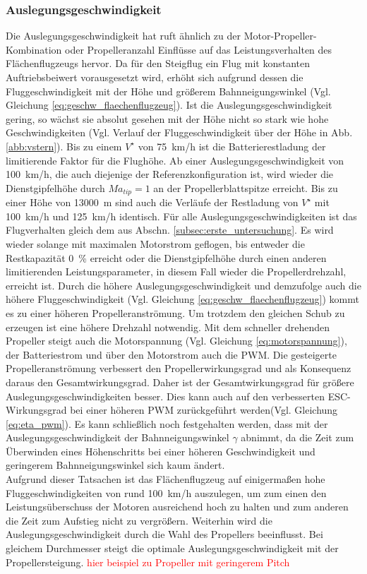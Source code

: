 \subsubsection{Auslegungsgeschwindigkeit}
\label{subsubsec:vstern}
Die Auslegungsgeschwindigkeit hat ruft ähnlich zu der Motor-Propeller-Kombination oder Propelleranzahl Einflüsse auf das Leistungsverhalten des Flächenflugzeugs hervor. Da für den Steigflug ein Flug mit konstanten Auftriebsbeiwert vorausgesetzt wird, erhöht sich aufgrund dessen die Fluggeschwindigkeit mit der Höhe und größerem Bahnneigungswinkel (Vgl. Gleichung \ref{eq:geschw_flaechenflugzeug}).
Ist die Auslegungsgeschwindigkeit gering, so wächst sie absolut gesehen mit der Höhe nicht so stark wie hohe Geschwindigkeiten (Vgl. Verlauf der Fluggeschwindigkeit über der Höhe in Abb. \ref{abb:vstern}). 
Bis zu einem \ensuremath{V^\star} von \SI{75}{km/h} ist die Batterierestladung der limitierende Faktor für die Flughöhe. Ab einer Auslegungsgeschwindigkeit von \SI{100}{km/h}, die auch diejenige der Referenzkonfiguration ist, wird wieder die Dienstgipfelhöhe durch \ensuremath{Ma_{tip} = 1} an der Propellerblattspitze erreicht. Bis zu einer Höhe von \SI{13000}{m} sind auch die Verläufe der Restladung von \ensuremath{V^\star} mit \SI{100}{km/h} und \SI{125}{km/h} identisch. Für alle Auslegungsgeschwindigkeiten ist das Flugverhalten gleich dem aus Abschn. \ref{subsec:erste_untersuchung}. Es wird wieder solange mit maximalen Motorstrom geflogen, bis entweder die Restkapazität \SI{0}{\%} erreicht oder die Dienstgipfelhöhe durch einen anderen limitierenden Leistungsparameter, in diesem Fall wieder die Propellerdrehzahl, erreicht ist. Durch die höhere Auslegungsgeschwindigkeit und demzufolge auch die höhere Fluggeschwindigkeit (Vgl. Gleichung \ref{eq:geschw_flaechenflugzeug}) kommt es zu einer höheren Propelleranströmung. Um trotzdem den gleichen Schub zu erzeugen ist eine höhere Drehzahl notwendig. Mit dem schneller drehenden Propeller steigt auch die Motorspannung (Vgl. Gleichung \ref{eq:motorspannung}), der Batteriestrom und über den Motorstrom auch die PWM. Die gesteigerte Propelleranströmung verbessert den Propellerwirkungsgrad und als Konsequenz daraus den Gesamtwirkungsgrad. Daher ist der Gesamtwirkungsgrad für größere Auslegungsgeschwindigkeiten besser. Dies kann auch auf den verbesserten ESC-Wirkungsgrad bei einer höheren PWM zurückgeführt werden(Vgl. Gleichung \ref{eq:eta_pwm}). Es kann schließlich noch festgehalten werden, dass mit der Auslegungsgeschwindigkeit der Bahnneigungswinkel \ensuremath{\gamma} abnimmt, da die Zeit zum Überwinden eines Höhenschritts bei einer höheren Geschwindigkeit und geringerem Bahnneigungswinkel sich kaum ändert. \\
Aufgrund dieser Tatsachen ist das Flächenflugzeug auf einigermaßen hohe Fluggeschwindigkeiten von rund \SI{100}{km/h} auszulegen, um zum einen den Leistungsüberschuss der Motoren ausreichend hoch zu halten und zum anderen die Zeit zum Aufstieg nicht zu vergrößern. Weiterhin wird die Auslegungsgeschwindigkeit durch die Wahl des Propellers beeinflusst. Bei gleichem Durchmesser steigt die optimale Auslegungsgeschwindigkeit mit der Propellersteigung.
\textcolor{red}{hier beispiel zu Propeller mit geringerem Pitch}

